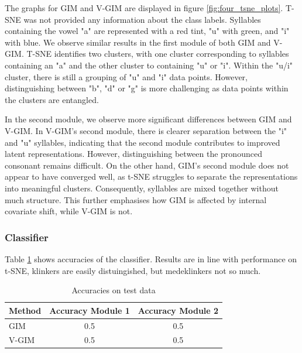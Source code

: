 	The graphs for GIM and V-GIM are displayed in figure \ref{fig:four_tsne_plots}. T-SNE was not provided any information about the class labels. Syllables containing the vowel "a" are represented with a red tint, "u" with green, and "i" with blue. We observe similar results in the first module of both GIM and V-GIM. T-SNE identifies two clusters, with one cluster corresponding to syllables containing an "a" and the other cluster to containing "u" or "i". Within the "u/i" cluster, there is still a grouping of "u" and "i" data points. However, distinguishing between "b", "d" or "g" is more challenging as data points within the clusters are entangled.
	
	In the second module, we observe more significant differences between GIM and V-GIM. In V-GIM's second module, there is clearer separation between the "i" and "u" syllables, indicating that the second module contributes to improved latent representations. However, distinguishing between the pronounced consonant remains difficult. On the other hand, GIM's second module does not appear to have converged well, as t-SNE struggles to separate the representations into meaningful clusters. Consequently, syllables are mixed together without much structure. This further emphasises how GIM is affected by internal covariate shift, while V-GIM is not.
	
	
	
		
	
	\subsubsection{Classifier}
	Table \ref{tab:classifier_accuracies} shows accuracies of the classifier. Results are in line with performance on t-SNE, klinkers are easily distuingished, but medeklinkers not so much.

		\begin{table}[htbp]
			\centering
			\begin{tabular}{|l|c|c|}
				\hline
				\textbf{Method} & \textbf{Accuracy Module 1} & \textbf{Accuracy Module 2} \\ \hline
				GIM         	& 0.5                   & 0.5              \\ \hline
				V-GIM         	& 0.5                   & 0.5              \\ \hline
			\end{tabular}
			\caption{Accuracies on test data}
			\label{tab:classifier_accuracies}
		\end{table}
		

